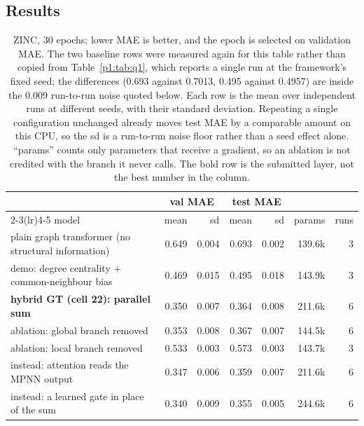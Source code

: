 \subsection*{Results}

\begin{table}[H]
  \centering
  \small
  \caption{ZINC, 30 epochs; lower MAE is better, and the epoch is selected on validation
           MAE. The two baseline rows were measured again for this table rather than copied
           from Table~\ref{p1:tab:q1}, which reports a single run at the framework's fixed
           seed; the differences (0.693 against 0.7013, 0.495 against 0.4957) are inside the
           0.009 run-to-run noise quoted below. Each row is the mean over independent runs at different seeds, with their
           standard deviation. Repeating a single configuration unchanged already moves test
           MAE by a comparable amount on this CPU, so the sd is a run-to-run noise floor
           rather than a seed effect alone. ``params'' counts only parameters that receive a
           gradient, so an ablation is not credited with the branch it never calls. The
           bold row is the submitted layer, not the best number in the column.}
  \label{p2:tab:zinc}
  \begin{tabular}{lrrrrrr}
    \toprule
    & \multicolumn{2}{c}{val MAE} & \multicolumn{2}{c}{test MAE} & & \\
    \cmidrule(lr){2-3}\cmidrule(lr){4-5}
    model & mean & sd & mean & sd & params & runs \\
    \midrule
    plain graph transformer (no structural information) & 0.649 & 0.004 & 0.693 & 0.002 & 139.6k & 3 \\
    demo: degree centrality + common-neighbour bias & 0.469 & 0.015 & 0.495 & 0.018 & 143.9k & 3 \\
    \midrule
    \textbf{hybrid GT (cell 22): parallel sum} & 0.350 & 0.007 & 0.364 & 0.008 & 211.6k & 6 \\
    \quad ablation: global branch removed & 0.353 & 0.008 & 0.367 & 0.007 & 144.5k & 6 \\
    \quad ablation: local branch removed & 0.533 & 0.003 & 0.573 & 0.003 & 143.7k & 3 \\
    \midrule
    \quad instead: attention reads the MPNN output & 0.347 & 0.006 & 0.359 & 0.007 & 211.6k & 6 \\
    \quad instead: a learned gate in place of the sum & 0.340 & 0.009 & 0.355 & 0.005 & 244.6k & 6 \\
    \bottomrule
  \end{tabular}
\end{table}

